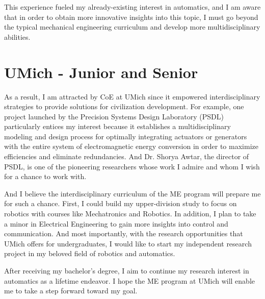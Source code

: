 \documentclass[12pt]{article}
\begin{document}
This experience fueled my already-existing interest in automatics, and I am aware that in order to obtain more innovative insights into this topic, I must go beyond the typical mechanical engineering curriculum and develop more multidisciplinary abilities.

\section {UMich - Junior and Senior}

As a result, I am attracted by CoE at UMich since it empowered interdisciplinary strategies to provide solutions for civilization development. For example, one project launched by the Precision Systems Design Laboratory (PSDL) particularly entices my interest because it establishes a multidisciplinary modeling and design process for optimally integrating actuators or generators with the entire system of electromagnetic energy conversion in order to maximize efficiencies and eliminate redundancies. And Dr. Shorya Awtar, the director of PSDL, is one of the pioneering researchers whose work I admire and whom I wish for a chance to work with. 


And I believe the interdisciplinary curriculum of the ME program will prepare me for such a chance. First, I could build my upper-division study to focus on robotics with courses like Mechatronics and Robotics. In addition, I plan to take a minor in Electrical Engineering to gain more insights into control and communication. And most importantly, with the research opportunities that UMich offers for undergraduates, I would like to start my independent research project in my beloved field of robotics and automatics. 

After receiving my bachelor's degree, I aim to continue my research interest in automatics as a lifetime endeavor. I hope the ME program at UMich will enable me to take a step forward toward my goal. 



\end{document}
